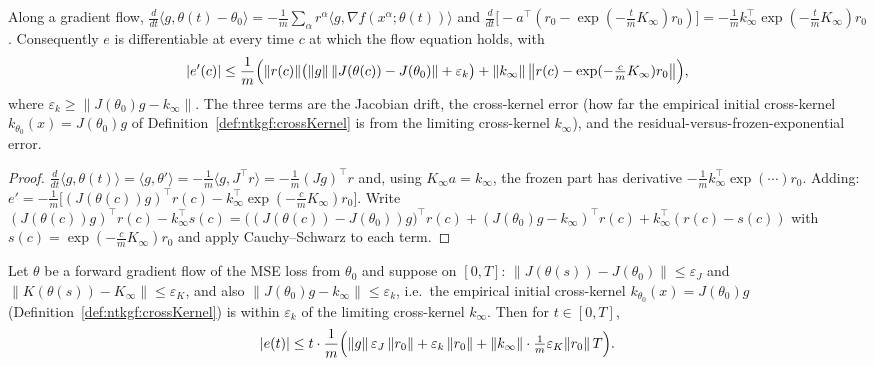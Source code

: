 \begin{lemma}\label{lem:ntkgf:predictionDerivative}
  \leanok
Along a gradient flow, $\frac d{dt}\langle g,\theta(t)-\theta_0\rangle=-\frac1m\sum_\alpha r^\alpha\langle g,\nabla f(x^\alpha;\theta(t))\rangle$ and
$\frac{d}{dt}\bigl[-a^\top(r_0-\exp(-\tfrac tmK_\infty)r_0)\bigr]=-\frac1mk_\infty^\top\exp(-\tfrac tmK_\infty)r_0$. Consequently $e$ is differentiable at every time $c$ at which the flow equation holds, with
\[
  |e'(c)|\le\frac1m\Bigl(\|r(c)\|\bigl(\|g\|\,\|J(\theta(c))-J(\theta_0)\|+\varepsilon_k\bigr)+\|k_\infty\|\,\bigl\|r(c)-\exp(-\tfrac cmK_\infty)r_0\bigr\|\Bigr),
\]
where $\varepsilon_k\ge\|J(\theta_0)g-k_\infty\|$. The three terms are the Jacobian drift, the cross-kernel error (how far the empirical initial cross-kernel $k_{\theta_0}(x)=J(\theta_0)g$ of Definition~\ref{def:ntkgf:crossKernel} is from the limiting cross-kernel $k_\infty$), and the residual-versus-frozen-exponential error.
\end{lemma}

\begin{proof}
  \leanok
$\frac{d}{dt}\langle g,\theta(t)\rangle=\langle g,\theta'\rangle=-\frac1m\langle g,J^\top r\rangle=-\frac1m(Jg)^\top r$ and, using $K_\infty a=k_\infty$, the frozen part has derivative $-\frac1m k_\infty^\top\exp(\cdots)r_0$.
Adding: $e'=-\frac1m\bigl[(J(\theta(c))g)^\top r(c)-k_\infty^\top\exp(-\tfrac cmK_\infty)r_0\bigr]$. Write
$(J(\theta(c))g)^\top r(c)-k_\infty^\top s(c)=\bigl((J(\theta(c))-J(\theta_0))g\bigr)^\top r(c)+(J(\theta_0)g-k_\infty)^\top r(c)+k_\infty^\top(r(c)-s(c))$ with $s(c)=\exp(-\tfrac cmK_\infty)r_0$ and apply Cauchy--Schwarz to each term.
\end{proof}

\begin{theorem}\label{thm:ntkgf:predictionError}
  \leanok
Let $\theta$ be a forward gradient flow of the MSE loss from $\theta_0$ and suppose on $[0,T]$: $\|J(\theta(s))-J(\theta_0)\|\le\varepsilon_J$ and $\|K(\theta(s))-K_\infty\|\le\varepsilon_K$, and also
$\|J(\theta_0)g-k_\infty\|\le\varepsilon_k$, i.e.\ the empirical initial cross-kernel $k_{\theta_0}(x)=J(\theta_0)g$ (Definition~\ref{def:ntkgf:crossKernel}) is within $\varepsilon_k$ of the limiting cross-kernel $k_\infty$. Then for $t\in[0,T]$,
\[
  |e(t)|\le t\cdot\frac1m\Bigl(\|g\|\,\varepsilon_J\,\|r_0\|+\varepsilon_k\,\|r_0\|+\|k_\infty\|\cdot\tfrac1m\varepsilon_K\|r_0\|\,T\Bigr).
\]
\end{theorem}

